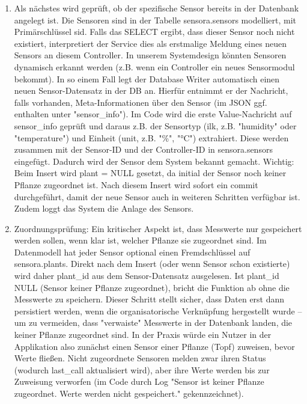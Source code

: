 \begin{enumerate}
\begin{enumerate}
\begin{enumerate}
            \item Als nächstes wird geprüft, ob der spezifische Sensor bereits in der Datenbank angelegt ist. Die Sensoren sind in der Tabelle sensora.sensors modelliert, mit Primärschlüssel sid. Falls das SELECT ergibt, dass dieser Sensor noch nicht existiert, interpretiert der Service dies als erstmalige Meldung eines neuen Sensors an diesem Controller. In unserem Systemdesign könnten Sensoren dynamisch erkannt werden (z.B. wenn ein Controller ein neues Sensormodul bekommt). In so einem Fall legt der Database Writer automatisch einen neuen Sensor-Datensatz in der DB an. Hierfür entnimmt er der Nachricht, falls vorhanden, Meta-Informationen über den Sensor (im JSON ggf. enthalten unter "sensor\_info"). Im Code wird die erste Value-Nachricht auf sensor\_info geprüft und daraus z.B. der Sensortyp (ilk, z.B. "humidity" oder "temperature") und Einheit (unit, z.B. "\%", "°C") extrahiert. Diese werden zusammen mit der Sensor-ID und der Controller-ID in sensora.sensors eingefügt. Dadurch wird der Sensor dem System bekannt gemacht. Wichtig: Beim Insert wird plant = NULL gesetzt, da initial der Sensor noch keiner Pflanze zugeordnet ist. Nach diesem Insert wird sofort ein commit durchgeführt, damit der neue Sensor auch in weiteren Schritten verfügbar ist. Zudem loggt das System die Anlage des Sensors.
            \item Zuordnungsprüfung: Ein kritischer Aspekt ist, dass Messwerte nur gespeichert werden sollen, wenn klar ist, welcher Pflanze sie zugeordnet sind. Im Datenmodell hat jeder Sensor optional einen Fremdschlüssel auf sensora.plants. Direkt nach dem Insert (oder wenn Sensor schon existierte) wird daher plant\_id aus dem Sensor-Datensatz ausgelesen. Ist plant\_id NULL (Sensor keiner Pflanze zugeordnet), bricht die Funktion ab ohne die Messwerte zu speichern. Dieser Schritt stellt sicher, dass Daten erst dann persistiert werden, wenn die organisatorische Verknüpfung hergestellt wurde –  um zu vermeiden, dass "verwaiste" Messwerte in der Datenbank landen, die keiner Pflanze zugeordnet sind. In der Praxis würde ein Nutzer in der Applikation also zunächst einen Sensor einer Pflanze (Topf) zuweisen, bevor Werte fließen. Nicht zugeordnete Sensoren melden zwar ihren Status (wodurch last\_call aktualisiert wird), aber ihre Werte werden bis zur Zuweisung verworfen (im Code durch Log "Sensor ist keiner Pflanze zugeordnet. Werte werden nicht gespeichert." gekennzeichnet).
            

\end{enumerate}
\end{enumerate}
\end{enumerate}
